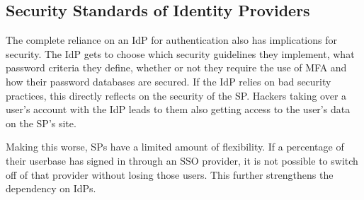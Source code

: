 \subsection{Security Standards of Identity Providers}

The complete reliance on an \ac{IdP} for authentication also has implications for security.
The \ac{IdP} gets to choose which security guidelines they implement, what password criteria they define,
whether or not they require the use of \ac{MFA} and how their password databases are secured.
If the \ac{IdP} relies on bad security practices, this directly reflects on the security of the \ac{SP}.
Hackers taking over a user's account with the \ac{IdP} leads to them also getting access to the user's data on the \ac{SP}'s site.

Making this worse, \acp{SP} have a limited amount of flexibility. If a percentage of their userbase has signed in through an \ac{SSO}
provider, it is not possible to switch off of that provider without losing those users.
This further strengthens the dependency on \acp{IdP}.

